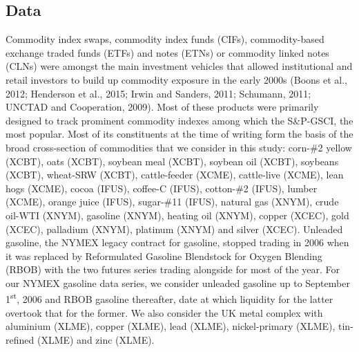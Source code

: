 \documentclass[]{elsarticle} %
\begin{document}
\hypertarget{co-movement-data}{%
\subsection{Data}\label{co-movement-data}}

Commodity index swaps, commodity index funds (CIFs), commodity-based exchange traded funds (ETFs) and notes (ETNs) or commodity linked notes (CLNs) were amongst the main investment vehicles that allowed institutional and retail investors to build up commodity exposure in the early 2000s (Boons et al., 2012; Henderson et al., 2015; Irwin and Sanders, 2011; Schumann, 2011; UNCTAD and Cooperation, 2009). Most of these products were primarily designed to track prominent commodity indexes among which the S\&P-GSCI, the most popular. Most of its constituents at the time of writing form the basis of the broad cross-section of commodities that we consider in this study: corn-\#2 yellow (XCBT), oats (XCBT), soybean meal (XCBT), soybean oil (XCBT), soybeans (XCBT), wheat-SRW (XCBT), cattle-feeder (XCME), cattle-live (XCME), lean hogs (XCME), cocoa (IFUS), coffee-C (IFUS), cotton-\#2 (IFUS), lumber (XCME), orange juice (IFUS), sugar-\#11 (IFUS), natural gas (XNYM), crude oil-WTI (XNYM), gasoline (XNYM), heating oil (XNYM), copper (XCEC), gold (XCEC), palladium (XNYM), platinum (XNYM) and silver (XCEC). Unleaded gasoline, the NYMEX legacy contract for gasoline, stopped trading in 2006 when it was replaced by Reformulated Gasoline Blendstock for Oxygen Blending (RBOB) with the two futures series trading alongside for most of the year. For our NYMEX gasoline data series, we consider unleaded gasoline up to September 1\textsuperscript{st}, 2006 and RBOB gasoline thereafter, date at which liquidity for the latter overtook that for the former. We also consider the UK metal complex with aluminium (XLME), copper (XLME), lead (XLME), nickel-primary (XLME), tin-refined (XLME) and zinc (XLME).\\
\end{document}
